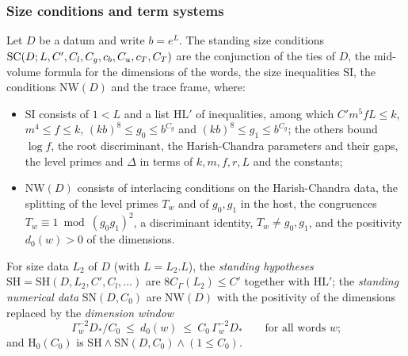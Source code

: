 \subsubsection{Size conditions and term systems}

\begin{definition}\label{pf:open0:def:standing}
Let $D$ be a datum and write $b=e^L$. The standing size conditions $\mathrm{SC}(D;L,C',C_l,C_g,c_b,C_u,c_T,C_T)$ are the
conjunction of the ties of $D$, the mid-volume formula for the dimensions of the words, the size inequalities
$\mathrm{SI}$, the conditions $\mathrm{NW}(D)$ and the trace frame, where:
\begin{itemize}
\item $\mathrm{SI}$ consists of $1<L$ and a list $\mathrm{HL}'$ of inequalities, among which $C'm^5fL\le k$, $m^4\le f\le k$,
$(kb)^8\le g_0\le b^{C_g}$ and $(kb)^8\le g_1\le b^{C_g}$; the others bound $\log f$, the root discriminant, the
Harish-Chandra parameters and their gaps, the level primes and $\Delta$ in terms of $k,m,f,r,L$ and the constants;
\item $\mathrm{NW}(D)$ consists of interlacing conditions on the Harish-Chandra data, the splitting of the level primes
$T_w$ and of $g_0,g_1$ in the host, the congruences $T_w\equiv1\bmod(g_0g_1)^2$, a discriminant identity, $T_w\ne g_0,g_1$,
and the positivity $d_0(w)>0$ of the dimensions.
\end{itemize}
For size data $L_2$ of $D$ (with $L=L_2.L$), the \emph{standing hypotheses} $\mathrm{SH}=\mathrm{SH}(D,L_2,C',C_l,\dots)$ are
$8C_\Gamma(L_2)\le C'$ together with $\mathrm{HL}'$; the \emph{standing numerical data} $\mathrm{SN}(D,C_0)$ are $\mathrm{NW}(D)$
with the positivity of the dimensions replaced by the \emph{dimension window}
\begin{equation}\label{pf:open0:eq:window}
\Gamma_w^{-2}D_*/C_0\ \le\ d_0(w)\ \le\ C_0\,\Gamma_w^{-2}D_*\qquad\text{for all words $w$;}
\end{equation}
and $\mathrm{H}_0(C_0)$ is $\mathrm{SH}\wedge\mathrm{SN}(D,C_0)\wedge(1\le C_0)$.
\ \ \
\ \
\end{definition}

